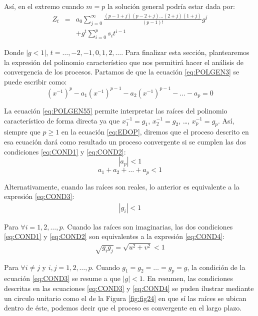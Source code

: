 \documentclass[
]{book}
\begin{document}
Así, en el extremo cuando \(m = p\) la solución general podría estar dada por:
\begin{eqnarray}
    Z_t & = & a_0 \sum_{j = 0}^{\infty} \frac{(p-1+j)(p-2+j) \ldots (2+j)(1+j)}{(p-1)!} g^j \nonumber \\
    & & + g^t \sum_{i = 0}^p s_i t^{i-1}
    \label{eq:EDOPGEN6}
\end{eqnarray}

Donde \(|{g} < 1|\), \(t = \ldots, -2, -1, 0, 1, 2, \ldots\). Para finalizar esta sección, plantearemos la expresión del polinomio característico que nos permitirá hacer el análisis de convergencia de los procesos. Partamos de que la ecuación \eqref{eq:POLGEN3} se puede escribir como:
\begin{equation}
    (x^{-1})^p - a_1 (x^{-1})^{p-1} - a_2 (x^{-1})^{p-1} - \ldots - a_p = 0
    \label{eq:POLGEN55}
\end{equation}

La ecuación \eqref{eq:POLGEN55} permite interpretar las raíces del polinomio característico de forma directa ya que \(x^{-1}_1 = g_1\), \(x^{-1}_2 = g_2\), \ldots, \(x^{-1}_p = g_p\). Así, siempre que \(p \geq 1\) en la ecuación \eqref{eq:EDOP}, diremos que el proceso descrito en esa ecuación dará como resultado un proceso convergente si se cumplen las dos condiciones \eqref{eq:COND1} y \eqref{eq:COND2}:
\begin{equation}
    |a_p| < 1  
    \label{eq:COND1}
\end{equation}
\begin{equation}
    a_1 + a_2 + \ldots + a_p < 1
    \label{eq:COND2}
\end{equation}

Alternativamente, cuando las raíces son reales, lo anterior es equivalente a la expresión \eqref{eq:COND3}:
\begin{eqnarray}
    |g_i| < 1
    \label{eq:COND3}
\end{eqnarray}

Para \(\forall i = 1, 2, \ldots, p\). Cuando las raíces son imaginarias, las dos condiciones \eqref{eq:COND1} y \eqref{eq:COND2} son equivalentes a la expresión \eqref{eq:COND4}:
\begin{eqnarray}
    \sqrt{g_i g_j} = \sqrt{u^2 + v^2} < 1 
    \label{eq:COND4}
\end{eqnarray}

Para \(\forall i \neq j\) y \(i, j = 1, 2, \ldots, p\). Cuando \(g_1 = g_2 = \ldots = g_p = g\), la condición de la ecuación \eqref{eq:COND3} se resume a que \(|g| < 1\). En resumen, las condiciones descritas en las ecuaciones \eqref{eq:COND3} y \eqref{eq:COND4} se puden ilustrar mediante un circulo unitario como el de la Figura \ref{fig:fig24} en que sí las raíces se ubican dentro de éste, podemos decir que el proceso es convergente en el largo plazo.
\end{document}

